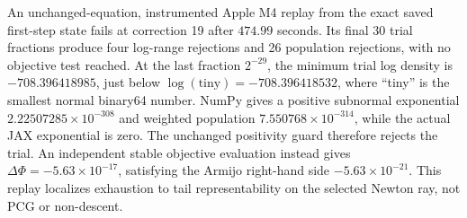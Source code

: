 \documentclass[11pt,letterpaper]{article}
\begin{document}
An unchanged-equation, instrumented Apple M4 replay from the exact saved
first-step state fails at correction 19 after $474.99$ seconds. Its final
30 trial fractions produce four log-range rejections and 26 population
rejections, with no objective test reached. At the last fraction $2^{-29}$,
the minimum trial log density is $-708.396418985$, just below
$\log(\mathrm{tiny})=-708.396418532$, where ``tiny'' is the smallest normal
binary64 number. NumPy gives a positive subnormal exponential
$2.22507285\times10^{-308}$ and weighted population
$7.550768\times10^{-314}$, while the actual JAX exponential is zero.
The unchanged positivity guard therefore rejects the trial.
An independent stable objective evaluation instead gives
$\Delta\Phi=-5.63\times10^{-17}$, satisfying the Armijo right-hand side
$-5.63\times10^{-21}$. This replay localizes exhaustion to tail
representability on the selected Newton ray, not PCG or non-descent.
\end{document}
